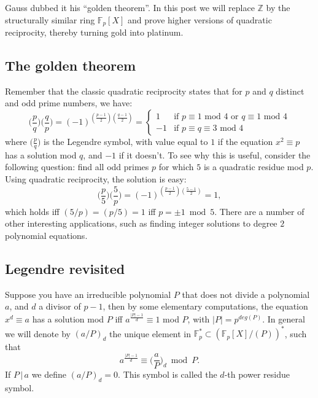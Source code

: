 Gauss dubbed it his ``golden theorem''. In this post we will replace ${\mathbb{Z}}$ by the structurally similar ring ${\mathbb{F}_{p}[X]}$ and prove higher versions of quadratic reciprocity, thereby turning gold into platinum.

\subsection{The golden theorem}

Remember that the classic quadratic reciprocity states that for ${p}$ and ${q}$ distinct and odd prime numbers, we have:
\begin{equation}
  \bigg( \frac{p}{q} \bigg) \bigg( \frac{q}{p} \bigg)=(-1)^{(\frac{p-1}{2})(\frac{q-1}{2})}= \left\{ \begin{array}{ll} 1 & \textrm{if $p \equiv 1$ mod $4$ or $q \equiv 1$ mod $4$}\\ -1 & \textrm{if $p \equiv q \equiv 3$ mod $4$} \end{array} \right.
\end{equation}
where $\big( \frac{p}{q} \big)$ is the Legendre symbol, with value equal to $1$ if the equation $x^{2} \equiv p$ has a solution mod $q$, and $-1$ if it doesn't. To see why this is useful, consider the following question: find all odd primes $p$ for which $5$ is a quadratic residue mod $p$. Using quadratic reciprocity, the solution is easy:
\begin{equation}
  \bigg( \frac{p}{5} \bigg) \bigg( \frac{5}{p} \bigg)=(-1)^{(\frac{p-1}{2})(\frac{5-1}{2})}=1,
\end{equation}
which holds iff $(5/p)=(p/5)=1$ iff $p=\pm 1\bmod5$. There are a number of other interesting applications, such as finding integer solutions to degree $2$ polynomial equations.

\subsection{Legendre revisited}

Suppose you have an irreducible polynomial ${P}$ that does not divide a polynomial ${a}$, and ${d}$ a divisor of ${p-1}$, then by some elementary computations, the equation ${x^{d} \equiv a}$ has a solution mod ${P}$ iff ${a^{\frac{\vert P \vert -1}{d}} \equiv 1}$ mod ${P}$, with ${\vert P \vert = p^{deg(P)}}$. In general we will denote by ${(a/P)_{d}}$ the unique element in ${\mathbb{F}_{p}^{*} \subset (\mathbb{F}_{p}[X]/(P))^{*}}$, such that
\begin{equation}
  a^{\frac{\vert P \vert -1}{d}} \equiv \bigg( \frac{a}{P} \bigg)_{d}\bmod P.
\end{equation}
If ${P\,\vert\, a}$ we define ${(a/P)_{d}=0}$. This symbol is called the ${d}$-th power residue symbol.

